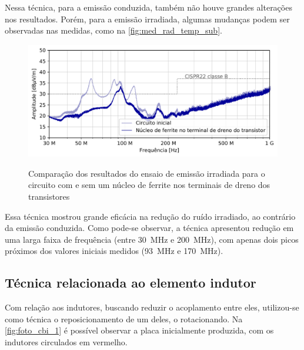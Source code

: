     Nessa técnica, para a emissão conduzida, também não houve grandes alterações nos resultados. Porém, para a emissão irradiada, algumas mudanças podem ser observadas nas medidas, como na \autoref{fig:med_rad_temp_sub}.  
    
    \begin{figure}[H]
    	\centering
    	\caption{Comparação dos resultados do ensaio de emissão irradiada para o circuito com e sem um núcleo de ferrite nos terminais de dreno dos transistores}
    	\includegraphics[scale=.9]{pdf/rad/Choke bead no terminal de dreno do transistor.pdf}
    	\label{fig:med_rad_choke}
    \end{figure}
    
    Essa técnica mostrou grande eficácia na redução do ruído irradiado, ao contrário da emissão conduzida. Como pode-se observar, a técnica apresentou redução em uma larga faixa de frequência (entre \SI{30}{\mega\hertz} e \SI{200}{\mega\hertz}), com apenas dois picos próximos dos valores iniciais medidos (\SI{93}{\mega\hertz} e \SI{170}{\mega\hertz}).
    
    \subsection{Técnica relacionada ao elemento indutor} \label{cap:result_tecnicas_indut}
    
    Com relação aos indutores, buscando reduzir o acoplamento entre eles, utilizou-se como técnica o reposicionamento de um deles, o rotacionando. Na \autoref{fig:foto_cbi_1} é possível observar a placa inicialmente produzida, com os indutores circulados em vermelho. 
    
